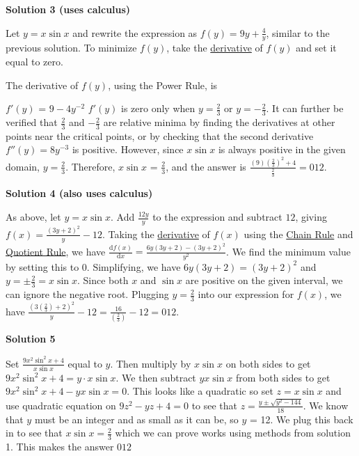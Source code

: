 \begin{enumerate}
\textbf{Solution 3 (uses calculus)}

Let $y = x\sin{x}$ and rewrite the expression as $f(y) = 9y + \frac{4}{y}$, similar to the previous solution. To minimize $f(y)$, take the \href{https://artofproblemsolving.com/wiki/index.php?title=Derivative}{derivative} of $f(y)$ and set it equal to zero. 

 The derivative of $f(y)$, using the Power Rule, is

 $f'(y)$ = $9 - 4y^{-2}$
$f'(y)$ is zero only when $y = \frac{2}{3}$ or $y = -\frac{2}{3}$. It can further be verified that $\frac{2}{3}$ and $-\frac{2}{3}$ are relative minima by finding the derivatives at other points near the critical points, or by checking that the second derivative $f''(y)=8y^{-3}$ is positive. However, since $x \sin{x}$ is always positive in the given domain, $y = \frac{2}{3}$. Therefore, $x\sin{x}$ = $\frac{2}{3}$, and the answer is $\frac{(9)(\frac{2}{3})^2 + 4}{\frac{2}{3}} = \boxed{012}$.

 



\textbf{Solution 4 (also uses calculus)}

As above, let $y = x\sin{x}$. Add $\frac{12y}{y}$ to the expression and subtract $12$, giving $f(x) = \frac{(3y+2)^2}{y} - 12$. Taking the \href{https://artofproblemsolving.com/wiki/index.php?title=Derivative}{derivative} of $f(x)$ using the \href{https://artofproblemsolving.com/wiki/index.php?title=Chain\_Rule}{Chain Rule} and \href{https://artofproblemsolving.com/wiki/index.php?title=Quotient\_Rule}{Quotient Rule}, we have $\frac{\text{d}f(x)}{\text{d}x} = \frac{6y(3y+2)-(3y+2)^2}{y^2}$. We find the minimum value by setting this to $0$. Simplifying, we have $6y(3y+2) = (3y+2)^2$ and $y = \pm{\frac{2}{3}} = x\sin{x}$. Since both $x$ and $\sin{x}$ are positive on the given interval, we can ignore the negative root. Plugging $y = \frac{2}{3}$ into our expression for $f(x)$, we have $\frac{(3(\frac{2}{3})+2)^2}{y}-12 = \frac{16}{\left(\frac{2}{3}\right)}-12 = \boxed{012}$.

 



\textbf{Solution 5}

Set $\frac{9x^2\sin^2 x + 4}{x\sin x}$ equal to $y$. Then multiply by $x\sin x$ on both sides to get $9x^2\sin^2 x + 4 = y\cdot x\sin x$.  We then subtract $yx\sin x$ from both sides to get $9x^2\sin^2 x + 4 - yx\sin x = 0$.  This looks like a quadratic so set $z= x\sin x$ and use quadratic equation on $9z^2 - yz + 4 = 0$ to see that $z = \frac{y\pm\sqrt{y^2-144}}{18}$. We know that $y$ must be an integer and as small as it can be, so $y$ = 12. We plug this back in to see that $x\sin x = \frac{2}{3}$ which we can prove works using methods from solution 1. This makes the answer $\boxed{012}$


\end{enumerate}
